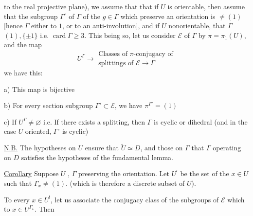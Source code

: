 
to the real projective plane), we assume that  that  if $U$ is  orientable, then   assume that the subgroup $\Gamma^\circ$ of $\Gamma$ of the $g\in\Gamma$ which preserve an orientation is $\ne(1)$ [hence $\Gamma$  either to $1$, or to  an anti-involution], and if $U$ nonorientable, that  $\Gamma$ \unsure{$\not\simeq$|$\ne$} $(1),\{\pm1\}$ i.e. $\operatorname{card}\Gamma\ge3$. This being so,  let us consider   $\mathcal E$ of $\Gamma$ by $\pi=\pi_1(U)$, and the map
\[
U^\Gamma\longrightarrow\begin{gathered}
\text{Classes of }\pi\text{-conjugacy of}\\
\text{splittings of }\mathcal E\longrightarrow\Gamma
\end{gathered}
\]
we have this:

 a) This map is bijective

 b) For every section subgroup $\Gamma'\subset\mathcal E$, we have $\pi^{\Gamma'}=(1)$

 c) If $U^\Gamma\ne\varnothing$ i.e. If there exists a splitting, then $\Gamma$ is cyclic or dihedral (and in the case $U$ oriented, $\Gamma^\circ$ is cyclic)

\uline{N.B.} The hypotheses on $U$ ensure that $\widetilde U\simeq D$, and those on $\Gamma$ that $\Gamma$ operating on $D$ satisfies the hypotheses of the fundamental lemma.




\uline{Corollary} Suppose  $U$ ,  $\Gamma$ preserving the orientation. Let $U^!$ be the set of the $x\in U$ such that $\Gamma_x\ne(1)$. (which is therefore a discrete subset of $U$).

To every $x\in U^!$, let us associate the conjugacy class of the subgroups of $\mathcal E$  which  to  $x\in U^{\Gamma_x}$. Then

